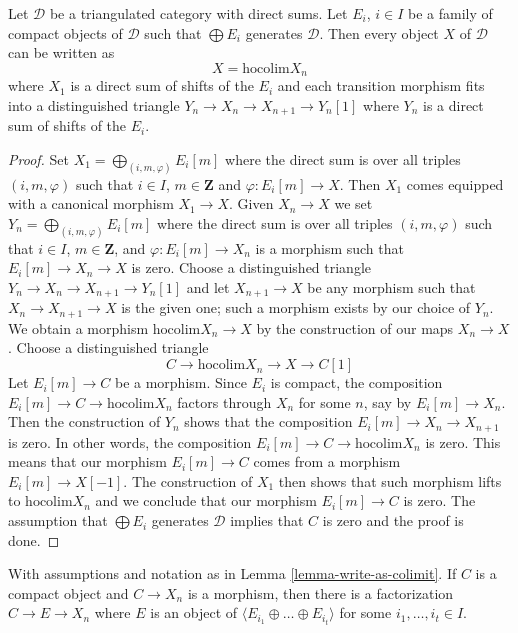 \begin{lemma}
\label{lemma-write-as-colimit}
Let $\mathcal{D}$ be a triangulated category with direct sums.
Let $E_i$, $i \in I$ be a family of compact objects of $\mathcal{D}$
such that $\bigoplus E_i$ generates $\mathcal{D}$.
Then every object $X$ of $\mathcal{D}$ can be written as
$$
X = \text{hocolim} X_n
$$
where $X_1$ is a direct sum of shifts of the $E_i$ and each transition
morphism fits into a distinguished triangle
$Y_n \to X_n \to X_{n + 1} \to Y_n[1]$
where $Y_n$ is a direct sum of shifts of the $E_i$.
\end{lemma}

\begin{proof}
Set $X_1 = \bigoplus_{(i, m, \varphi)} E_i[m]$ where the direct sum is over
all triples $(i, m, \varphi)$ such that $i \in I$, $m \in \mathbf{Z}$
and $\varphi : E_i[m] \to X$. Then $X_1$ comes equipped with a canonical
morphism $X_1 \to X$. Given $X_n \to X$ we set
$Y_n = \bigoplus_{(i, m, \varphi)} E_i[m]$ where the direct sum is over
all triples $(i, m, \varphi)$ such that $i \in I$, $m \in \mathbf{Z}$, and
$\varphi : E_i[m] \to X_n$ is a morphism such that $E_i[m] \to X_n \to X$
is zero. Choose a distinguished triangle
$Y_n \to X_n \to X_{n + 1} \to Y_n[1]$
and let $X_{n + 1} \to X$ be any morphism such that $X_n \to X_{n + 1} \to X$
is the given one; such a morphism exists by our choice of $Y_n$.
We obtain a morphism $\text{hocolim} X_n \to X$ by the construction
of our maps $X_n \to X$. Choose a distinguished triangle
$$
C \to \text{hocolim} X_n \to X \to C[1]
$$
Let $E_i[m] \to C$ be a morphism. Since $E_i$ is compact, the
composition $E_i[m] \to C \to \text{hocolim} X_n$ factors through
$X_n$ for some $n$, say by $E_i[m] \to X_n$. Then the
construction of $Y_n$ shows that the composition
$E_i[m] \to X_n \to X_{n + 1}$ is zero. In other words, the composition
$E_i[m] \to C \to \text{hocolim} X_n$ is zero. This means that our
morphism $E_i[m] \to C$ comes from a morphism $E_i[m] \to X[-1]$.
The construction of $X_1$ then shows that such morphism lifts to
$\text{hocolim} X_n$ and we conclude that our morphism $E_i[m] \to C$
is zero. The assumption that $\bigoplus E_i$ generates $\mathcal{D}$
implies that $C$ is zero and the proof is done.
\end{proof}

\begin{lemma}
\label{lemma-factor-through}
With assumptions and notation as in Lemma \ref{lemma-write-as-colimit}.
If $C$ is a compact object and $C \to X_n$ is a morphism, then
there is a factorization $C \to E \to X_n$ where
$E$ is an object of $\langle E_{i_1} \oplus \ldots \oplus E_{i_t} \rangle$
for some $i_1, \ldots, i_t \in I$.
\end{lemma}

